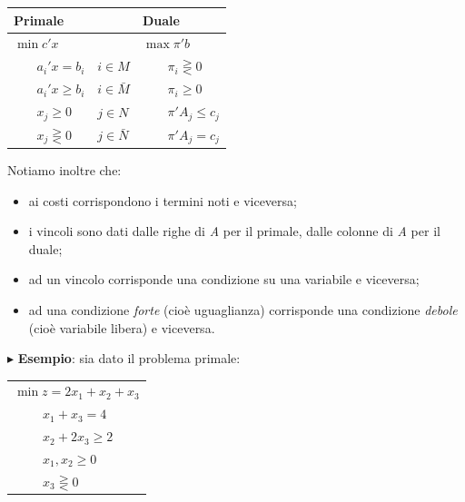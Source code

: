 \documentclass[11pt]{book}
\begin{document}
\vspace{11pt}
\begin{center}
\begin{tabular}{l l l}
{\bf Primale} & & {\bf Duale} \\\hline
$\min c'x$ &  & $\max \pi'b$ \\

$\phantom{min}a_i'x = b_i$ & $i \in M$ & $\phantom{max}\pi_i
\gtreqless 0$ \\

$\phantom{min}a_i'x \geq b_i$ & $i \in \bar{M}$ & $\phantom{max}\pi_i
\geq 0$ \\

$\phantom{min}x_j \geq 0$ & $j \in N$ & $\phantom{max}\pi'A_j \leq
c_j$ \\

$\phantom{min}x_j \gtreqless 0$ & $j \in \bar{N}$ & $\phantom{max}\pi'A_j = c_j$ \\
\end{tabular}
\end{center}
\vspace{11pt}

Notiamo inoltre che:

\begin{itemize}
\item ai costi corrispondono i termini noti e viceversa;
\item i vincoli sono dati dalle righe di {\em A} per il primale, dalle
  colonne di {\em A} per il duale;
\item ad un vincolo corrisponde una condizione su una variabile e
  viceversa;
\item ad una condizione {\em forte} (cio\`e uguaglianza) corrisponde
  una condizione {\em debole} (cio\`e variabile libera) e viceversa.
\end{itemize}

\vspace{11pt}
$\blacktriangleright$ {\bf Esempio}: sia dato il problema primale:

\vspace{11pt}
\begin{center}
\begin{tabular}{l}
$\min z = 2x_1 + x_2 + x_3$\\
$\phantom{min z}x_1 + x_3 = 4$\\
$\phantom{min z}x_2 + 2x_3 \geq 2$\\
$\phantom{min z}x_1,x_2 \geq 0$\\
$\phantom{min z}x_3 \gtreqless 0$\\
\end{tabular}
\end{center}
\vspace{11pt}
\end{document}
